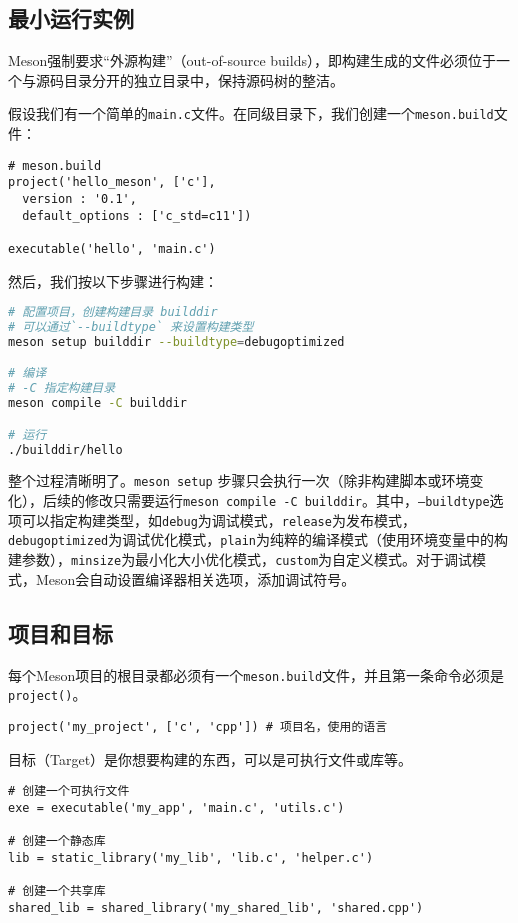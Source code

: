 \documentclass[../main.tex]{subfiles}
\begin{document}
\subsection{最小运行实例}
Meson强制要求“外源构建”（out-of-source builds），即构建生成的文件必须位于一个与源码目录分开的独立目录中，保持源码树的整洁。

假设我们有一个简单的\texttt{main.c}文件。在同级目录下，我们创建一个\texttt{meson.build}文件：
\begin{lstlisting}
# meson.build
project('hello_meson', ['c'],
  version : '0.1',
  default_options : ['c_std=c11'])

executable('hello', 'main.c')
\end{lstlisting}

然后，我们按以下步骤进行构建：
\begin{lstlisting}[language=bash]
# 配置项目，创建构建目录 builddir
# 可以通过`--buildtype` 来设置构建类型
meson setup builddir --buildtype=debugoptimized

# 编译
# -C 指定构建目录
meson compile -C builddir

# 运行
./builddir/hello
\end{lstlisting}

整个过程清晰明了。\texttt{meson setup} 步骤只会执行一次（除非构建脚本或环境变化），后续的修改只需要运行\texttt{meson compile -C builddir}。其中，\texttt{--buildtype}选项可以指定构建类型，如\texttt{debug}为调试模式，\texttt{release}为发布模式，\texttt{debugoptimized}为调试优化模式，\texttt{plain}为纯粹的编译模式（使用环境变量中的构建参数），\texttt{minsize}为最小化大小优化模式，\texttt{custom}为自定义模式。对于调试模式，Meson会自动设置编译器相关选项，添加调试符号。

\subsection{项目和目标}
每个Meson项目的根目录都必须有一个\texttt{meson.build}文件，并且第一条命令必须是\texttt{project()}。
\begin{lstlisting}
project('my_project', ['c', 'cpp']) # 项目名，使用的语言
\end{lstlisting}

目标（Target）是你想要构建的东西，可以是可执行文件或库等。
\begin{lstlisting}
# 创建一个可执行文件
exe = executable('my_app', 'main.c', 'utils.c')

# 创建一个静态库
lib = static_library('my_lib', 'lib.c', 'helper.c')

# 创建一个共享库
shared_lib = shared_library('my_shared_lib', 'shared.cpp')
\end{lstlisting}
\end{document}
